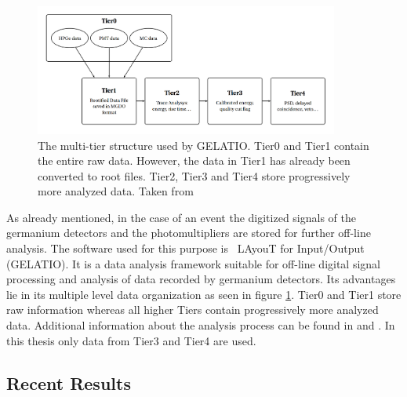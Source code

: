 \documentclass[encoding=utf8,british]{tumphthesis}
\begin{document}
\label{sec:Resultsofgerda}
\begin{figure}[t!]
	\centering
		\includegraphics[width=100mm]{./Bilder/TierStructure.png}
		\caption{The multi-tier structure used by GELATIO. Tier0 and Tier1 contain the entire raw data. However, the data in Tier1 has already been converted to root files. Tier2, Tier3 and Tier4 store  progressively more analyzed data. Taken from \cite{agostini_gelatio:_2011}}
		\label{fig:TierStructure}
\end{figure}

As already mentioned, in the case of an event the digitized signals of the germanium detectors and the photomultipliers are stored for further off-line analysis.
The software used for this purpose is \gerda\ LAyouT for Input/Output (GELATIO).
It is a data analysis framework suitable for off-line digital signal processing and analysis of data recorded by germanium detectors.
Its advantages lie in its multiple level data organization as seen in figure \ref{fig:TierStructure}.
Tier0 and Tier1 store raw information whereas all higher Tiers contain progressively more analyzed data.
Additional information about the analysis process can be found in \cite{agostini_gelatio:_2011} and \cite{agostini_off-line_2011}.
In this thesis only data from Tier3 and Tier4 are used.
\\

\subsection{Recent Results}
\end{document}
